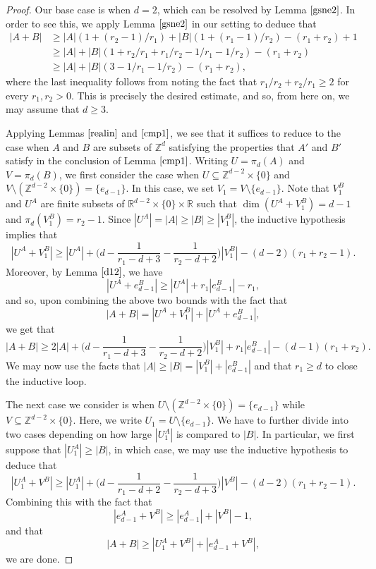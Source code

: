 \begin{proof}
Our base case is when $d=2$, which can be resolved by Lemma $\ref{gsne2}$. In order to see this, we apply Lemma $\ref{gsne2}$ in our setting to deduce that
\begin{align*}
 |A+B| & \geq  |A| (1 + (r_2-1)/r_1) + |B|(1 + (r_1 - 1)/r_2) - (r_1 + r_2) +1 \\
 & \geq |A| + |B|( 1 + r_2/r_1 + r_1/r_2 - 1/r_1 - 1/r_2 ) - (r_1 + r_2) \\
 & \geq |A| + |B|(3 - 1/r_1 - 1/r_2) - (r_1 + r_2),
 \end{align*}
where the last inequality follows from noting the fact that $r_1/r_2 + r_2/r_1 \geq 2$ for every $r_1, r_2 >0$. This is precisely the desired estimate, and so, from here on, we may assume that $d \geq 3$. 
\par

Applying Lemmas $\ref{realin}$ and $\ref{cmp1}$, we see that it suffices to reduce to the case when $A$ and $B$ are subsets of $\mathbb{Z}^d$ satisfying the properties that $A'$ and $B'$ satisfy in the conclusion of Lemma $\ref{cmp1}$. Writing $U = \pi_d(A)$ and $V = \pi_d(B)$, we first consider the case when $U \subseteq \mathbb{Z}^{d-2} \times \{0\}$ and $V \setminus (\mathbb{Z}^{d-2} \times \{0\}) = \{ e_{d-1}\}$. In this case, we set $V_1 = V \setminus \{e_{d-1}\}$. Note that $V_1^{B}$ and $U^{A}$ are finite subsets of $\mathbb{R}^{d-2} \times \{0\}\times \mathbb{R}$ such that $\dim(U^{A} + V_1^{B}) = d-1$ and $\pi_{d}(V_1^B) = r_2 - 1$. Since $|U^A| = |A| \geq |B| \geq |V_1^B|$, the inductive hypothesis implies that
\[ |U^A + V_1^B| \geq |U^A| + \bigg( d- \frac{1}{r_1 - d + 3} - \frac{1}{r_2 - d + 2} \bigg)|V_1^B| - (d-2)(r_1 + r_2 -1). \]
Moreover, by Lemma $\ref{d12}$, we have
\[ |U^A + e_{d-1}^B| \geq |U^A| + r_1 |e_{d-1}^B| - r_1 ,\]
and so, upon combining the above two bounds with the fact that
\[ |A+B| = |U^A + V_1^B| + |U^A + e_{d-1}^B|, \]
we get that
\[ |A+B| \geq 2|A| + \bigg( d - \frac{1}{r_1 - d + 3} - \frac{1}{r_2 - d + 2} \bigg)|V_1^B| + r_1 |e_{d-1}^B| - (d-1)(r_1 + r_2). \]
We may now use the facts that $|A| \geq |B| = |V_1^B| + |e_{d-1}^B|$ and that $r_1 \geq d$ to close the inductive loop. 
%
\par

The next case we consider is when $U \setminus (\mathbb{Z}^{d-2} \times \{0\}) = \{e_{d-1}\}$ while $V \subseteq \mathbb{Z}^{d-2} \times \{0\}$. Here, we write $U_1 = U \setminus \{ e_{d-1}\}$. We have to further divide into two cases depending on how large $|U_1^A|$ is compared to $|B|$. In particular, we first suppose that $|U_1^A| \geq |B|$, in which case, we may use the inductive hypothesis to deduce that
\[ |U_1^A + V^B| \geq |U_1^A| +  \bigg( d - \frac{1}{r_1 - d + 2} - \frac{1}{r_2 - d + 3} \bigg)|V^B| - (d-2)(r_1 + r_2-1).  \]
Combining this with the fact that 
\[ |e_{d-1}^A + V^B| \geq |e_{d-1}^A| + |V^B| - 1, \]
and that
\begin{equation} \label{rvn}
|A+ B| \geq |U_1^A + V^B| + |e_{d-1}^A + V^B| ,
\end{equation}
we are done.
\par


\end{proof}

